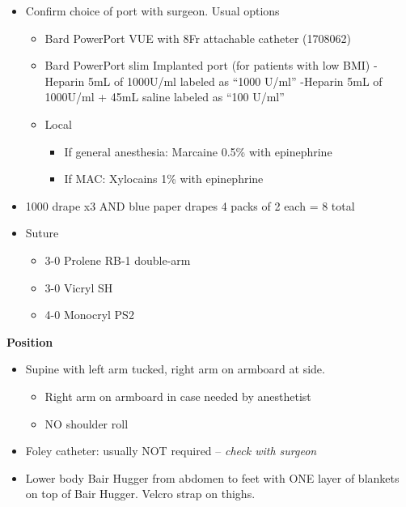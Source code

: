 \documentclass[
]{book}
\providecommand{\tightlist}{%
  \setlength{\itemsep}{0pt}\setlength{\parskip}{0pt}}
\begin{document}
\begin{itemize}
\tightlist
\item
  Confirm choice of port with surgeon. Usual options

  \begin{itemize}
  \tightlist
  \item
    Bard PowerPort VUE with 8Fr attachable catheter (1708062)
  \item
    Bard PowerPort slim Implanted port (for patients with low BMI)
    -Heparin 5mL of 1000U/ml labeled as ``1000 U/ml''
    -Heparin 5mL of 1000U/ml + 45mL saline labeled as ``100 U/ml''
  \item
    Local

    \begin{itemize}
    \tightlist
    \item
      If general anesthesia: Marcaine 0.5\% with epinephrine
    \item
      If MAC: Xylocains 1\% with epinephrine
    \end{itemize}
  \end{itemize}
\item
  1000 drape x3 AND blue paper drapes 4 packs of 2 each = 8 total
\item
  Suture

  \begin{itemize}
  \tightlist
  \item
    3-0 Prolene RB-1 double-arm
  \item
    3-0 Vicryl SH
  \item
    4-0 Monocryl PS2
  \end{itemize}
\end{itemize}

\textbf{Position}

\begin{itemize}
\tightlist
\item
  Supine with left arm tucked, right arm on armboard at side.

  \begin{itemize}
  \tightlist
  \item
    Right arm on armboard in case needed by anesthetist
  \item
    NO shoulder roll
  \end{itemize}
\item
  Foley catheter: usually NOT required -- \emph{check with surgeon}
\item
  Lower body Bair Hugger from abdomen to feet with ONE layer of blankets on top of Bair Hugger. Velcro strap on thighs.
\end{itemize}
\end{document}
